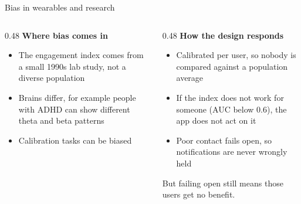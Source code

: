 \documentclass[aspectratio=169,11pt]{beamer}
\begin{document}
\begin{frame}{Bias in wearables and research}
  \begin{columns}[T]
    \begin{column}{0.48\textwidth}
      \small
      \textbf{Where bias comes in}
      \begin{itemize}

        \item The engagement index comes from a small 1990s lab study, not a diverse population
        \item Brains differ, for example people with ADHD can show different theta and beta patterns
        \item Calibration tasks can be biased
      \end{itemize}
    \end{column}

    \begin{column}{0.48\textwidth}
      \small
      \textbf{How the design responds}
      \begin{itemize}
        \item Calibrated per user, so nobody is compared against a population average
        \item If the index does not work for someone (AUC below 0.6), the app does not act on it
        \item Poor contact fails open, so notifications are never wrongly held
      \end{itemize}

      \vspace{0.2cm}
      But failing open still means those users get no benefit.
    \end{column}
  \end{columns}


\end{frame}
\end{document}
